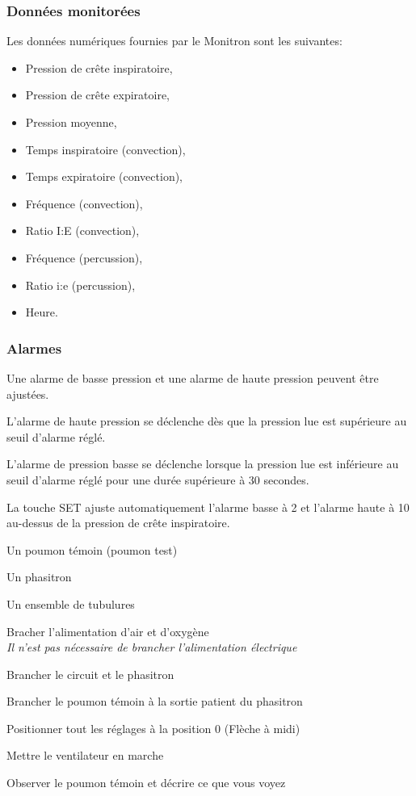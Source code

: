 \subsubsection{Données monitorées}

Les données numériques fournies par le Monitron sont les suivantes:

\begin{itemize}
\item Pression de crête inspiratoire,
\item Pression de crête expiratoire,
\item Pression moyenne,
\item Temps inspiratoire (convection),
\item Temps expiratoire (convection),
\item Fréquence (convection),
\item Ratio I:E (convection),
\item Fréquence (percussion),
\item Ratio i:e (percussion),
\item Heure.
\end{itemize}

\subsubsection{Alarmes}

Une alarme de basse pression et une alarme de haute pression peuvent être ajustées.

L'alarme de haute pression se déclenche dès que la pression lue est supérieure
au seuil d’alarme réglé.

L'alarme de pression basse se déclenche lorsque la pression lue est inférieure
au seuil d’alarme réglé pour une durée supérieure à 30 secondes.

La touche SET ajuste automatiquement l'alarme basse à 2 \cmh et l'alarme haute
à 10 \cmh au-dessus de la pression de crête inspiratoire.

\begin{exercice}
	\begin{materiel}
		\item Un poumon témoin (poumon test)
		\item Un phasitron
		\item Un ensemble de tubulures 
	\end{materiel}

	\begin{procedure}
	\item Bracher l'alimentation d'air et d'oxygène\\
		{\em \small Il n'est pas nécessaire de brancher l'alimentation électrique}
	\item Brancher le circuit et le phasitron
	\item Brancher le poumon témoin à la sortie patient du phasitron
	\item Positionner tout les réglages à la position 0 (Flèche à midi)
	\item Mettre le ventilateur en marche
	\item Observer le poumon témoin et décrire ce que vous voyez
	\end{procedure}
\end{exercice}
